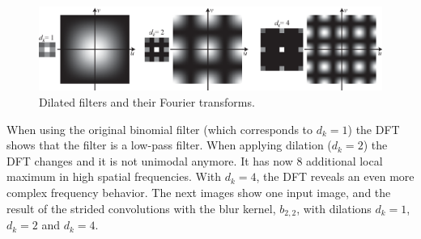 \begin{figure}[h]
\centerline{
    \includegraphics[width=1\linewidth]{./figures/convolutional_neural_nets/aliasing_dilated_kernel_binomial.eps}}
    \caption{Dilated filters and their Fourier transforms.}
\end{figure}

When using the original binomial filter (which corresponds to $d_k=1$) the DFT shows that the filter is a low-pass filter. When applying dilation ($d_k=2$) the DFT changes and it is not unimodal anymore. It has now 8 additional local maximum in high spatial frequencies. With $d_k=4$, the DFT reveals an even more complex frequency behavior. The next images show one input image, and the result of the strided convolutions with the blur kernel, $b_{2,2}$, with dilations $d_k=1$, $d_k=2$ and $d_k=4$. 

